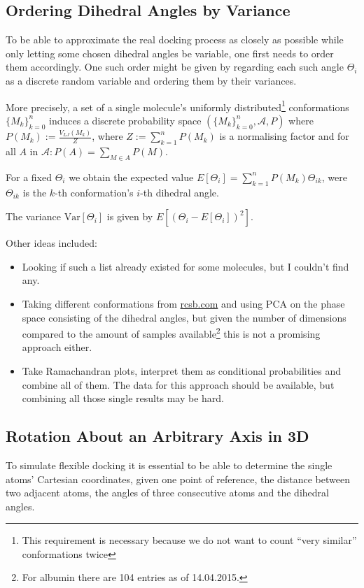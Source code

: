 \subsection{Ordering Dihedral Angles by Variance}
To be able to approximate the real docking process as closely as possible while only letting some chosen dihedral angles be variable, one first needs to order them accordingly. One such order might be given by regarding each such angle $\Theta_i$ as a discrete random variable and ordering them by their variances.

More precisely, a set of a single molecule's uniformly distributed\footnote{This requirement is necessary because we do not want to count ``very similar'' conformations twice} conformations $\{M_k\}_{k=0}^n$ induces a discrete probability space $(\{M_k\}_{k=0}^n,\mathscr{A},P)$ where $P(M_k):=\frac{V_{LJ}(M_k)}{Z}$, where $Z:=\sum_{k=1}^n P(M_k)$ is a normalising factor and for all $A$ in $\mathscr{A}: P(A) = \sum_{M\in A}P(M)$. 

For a fixed $\Theta_i$ we obtain the expected value $E[\Theta_i] = \sum_{k=1}^n P(M_k)\Theta_{ik}$, were $\Theta_{ik}$ is the $k$-th conformation's $i$-th dihedral angle.

The variance $\text{Var}[\Theta_i]$ is given by $E[(\Theta_i - E[\Theta_i])^2]$.

Other ideas included:
\begin{itemize}
	\item Looking if such a list already existed for some molecules, but I couldn't find any.
	\item Taking different conformations from \url{rcsb.com} and using PCA on the phase space consisting of the dihedral angles, but given the number of dimensions compared to the amount of samples available\footnote{For albumin there are 104 entries as of 14.04.2015.} this is not a promising approach either.
	\item Take Ramachandran plots, interpret them as conditional probabilities and combine all of them. The data for this approach should be available, but combining all those single results may be hard.
\end{itemize}

\subsection{Rotation About an Arbitrary Axis in 3D}
To simulate flexible docking it is essential to be able to determine the single atoms' Cartesian coordinates, given one point of reference, the distance between two adjacent atoms, the angles of three consecutive atoms and the dihedral angles.

